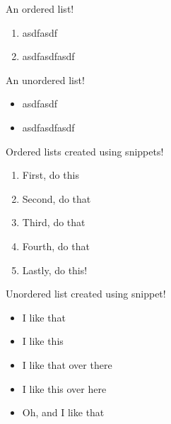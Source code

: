\documentclass{article}
\begin{document}
An ordered list!
\begin{enumerate}
    \item asdfasdf
    \item asdfasdfasdf
\end{enumerate}

An unordered list!
\begin{itemize}
    \item asdfasdf
    \item asdfasdfasdf
\end{itemize}

Ordered lists created using snippets!

\begin{enumerate}
	 \item First, do this
	 \item Second, do that
	 \item Third, do that
	 \item Fourth, do that
	 \item Lastly, do this!
\end{enumerate}

Unordered list created using snippet!

\begin{itemize}
     \item I like that
     \item I like this
     \item I like that over there
     \item I like this over here
     \item Oh, and I like that
\end{itemize}


\end{document}
